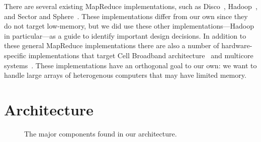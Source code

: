 \documentclass[10pt,letter,final,article,twocolumn]{article} %
\begin{document}
There are several existing MapReduce implementations, such as Disco~\citep{disco10}, Hadoop~\citep{hadoop10}, and Sector and Sphere~\citep{sphere09}. These implementations differ from our own since they do not target low-memory, but we did use these other implementations---Hadoop in particular---as a guide to identify important design decisions. In addition to these general MapReduce implementations there are also a number of hardware-specific implementations that target Cell Broadband architecture~\citep{rafique09} and multicore systems~\citep{chu06}. These implementations have an orthogonal goal to our own: we want to handle large arrays of heterogenous computers that may have limited memory.


\section{Architecture}
\label{sec:arch}
\begin{figure}[htbp]
\begin{center}
\caption{The major components found in our architecture.}
\label{fig:arch}
\end{center}
\end{figure}
\end{document}
